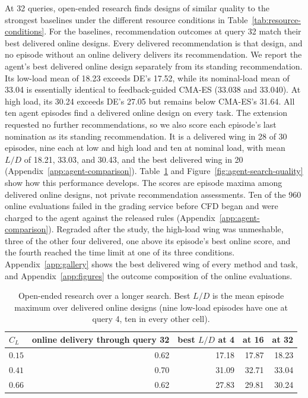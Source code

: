 \documentclass{article} %
\newcommand{\AgentLowBestAtC}{18.23}
\newcommand{\AgentNominalBestAtC}{33.04}
\newcommand{\AgentHighBestAtC}{30.24}
\begin{document}
At 32 queries, open-ended research finds designs of similar quality to the
strongest baselines under the different resource conditions in
Table~\ref{tab:resource-conditions}. For the baselines,
recommendation outcomes at query 32 match their best delivered online designs.
Every delivered recommendation is that design, and no episode without an online
delivery delivers its recommendation. We report the agent's best delivered
online design separately from its standing recommendation. Its
low-load mean of \AgentLowBestAtC{} exceeds DE's 17.52, while its nominal-load
mean of \AgentNominalBestAtC{} is essentially identical to feedback-guided
CMA-ES (33.038 and 33.040). At high load, its \AgentHighBestAtC{} exceeds DE's
27.05 but remains below CMA-ES's 31.64. All ten agent episodes find a delivered
online design on every task. The extension requested no further recommendations,
so we also score each episode's last nomination as its standing recommendation.
It is a delivered wing in 28 of 30 episodes, nine each at low and high load and
ten at nominal load, with mean $L/D$ of 18.21, 33.03, and 30.43, and the best
delivered wing in 20 (Appendix~\ref{app:agent-comparison}).
Table~\ref{tab:agent-extension} and Figure~\ref{fig:agent-search-quality}
show how this performance develops. The scores are episode maxima among
delivered online designs, not private recommendation assessments.
Ten of the 960 online evaluations failed in the grading service before CFD
began and were charged to the agent against the released rules
(Appendix~\ref{app:agent-comparison}). Regraded after the study, the high-load wing was unmeshable, three of the other four delivered, one above its episode's best online score, and the fourth reached the time limit at one of its three conditions.
Appendix~\ref{app:gallery} shows the
best delivered wing of every method and task, and Appendix~\ref{app:figures}
the outcome composition of the online evaluations.

\begin{table}[t]
\caption{Open-ended research over a longer search. Best $L/D$ is the mean
episode maximum over delivered online designs (nine low-load episodes have one
at query 4, ten in every other cell).}
\label{tab:agent-extension}
\centering
\scriptsize
\setlength{\tabcolsep}{4pt}
\begin{tabular*}{\textwidth}{@{\extracolsep{\fill}}lrrrr}
\toprule
$C_L$ & online delivery through query 32 & best $L/D$ at 4 & at 16 & at 32 \\
\midrule
$0.15$ & 0.62 & 17.18 & 17.87 & 18.23 \\
$0.41$ & 0.70 & 31.09 & 32.71 & 33.04 \\
$0.66$ & 0.62 & 27.83 & 29.81 & 30.24 \\
\bottomrule
\end{tabular*}
\end{table}
\end{document}
